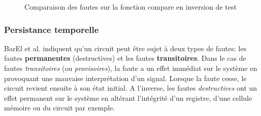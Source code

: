                 \begin{figure}
                  \caption{Comparaison des fautes sur la fonction compare en inversion de test}
                  \label{fig:soft-hard-compare}
                \end{figure}            
        
            \subsubsection{Persistance temporelle}
                
                BarEl et al. \cite{BarEl/IEEE06} indiquent qu'un circuit peut être sujet à deux types de fautes: les fautes \textbf{permanentes} (destructives) et les fautes \textbf{transitoires}.
                Dans le cas de fautes \textit{transitoires} (ou \textit{provisoires}), la faute a un effet immédiat sur le système en provoquant une mauvaise interprétation d'un signal. Lorsque la faute cesse, le circuit revient ensuite à son état initial.
                A l'inverse, les fautes \textit{destructives} ont un effet permanent sur le système en altérant l'intégrité d'un registre, d'une cellule mémoire ou du circuit par exemple.
                
